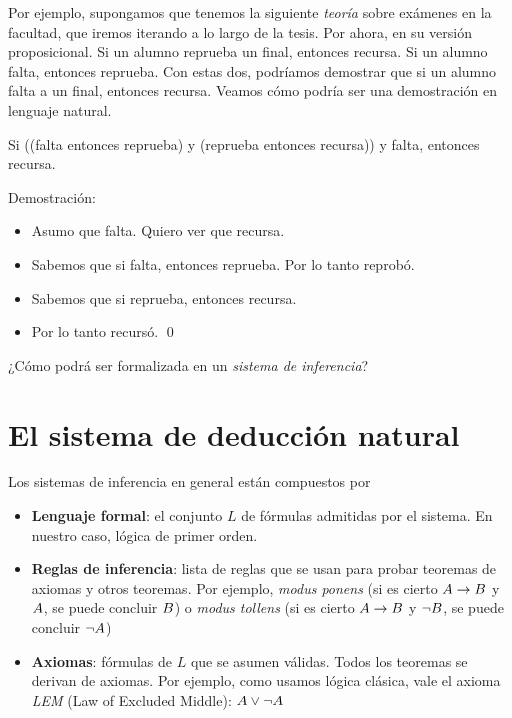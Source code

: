 Por ejemplo, supongamos que tenemos la siguiente \textit{teoría} sobre exámenes
en la facultad, que iremos iterando a lo largo de la tesis. Por ahora, en su
versión proposicional. Si un alumno reprueba un final, entonces recursa. Si un
alumno falta, entonces reprueba. Con estas dos, podríamos demostrar que si un
alumno falta a un final, entonces recursa. Veamos cómo podría ser una
demostración en lenguaje natural.

\begin{ejemplo}\label{nd:ex:exam}
    Si ((falta entonces reprueba) y (reprueba entonces recursa)) y falta, entonces recursa.

    Demostración:
\begin{itemize}
    \item Asumo que falta. Quiero ver que recursa.
    \item Sabemos que si falta, entonces reprueba. Por lo tanto reprobó.
    \item Sabemos que si reprueba, entonces recursa.
    \item Por lo tanto recursó. \qed
\end{itemize}
\end{ejemplo}

¿Cómo podrá ser formalizada en un \textit{sistema de inferencia}?

\section{El sistema de deducción natural}

Los sistemas de inferencia en general están compuestos por

\begin{itemize}
    \item \textbf{Lenguaje formal}: el conjunto $L$ de fórmulas admitidas por
    el sistema. En nuestro caso, lógica de primer orden.
    \item \textbf{Reglas de inferencia}: lista de reglas que se usan para probar
    teoremas de axiomas y otros teoremas. Por ejemplo, \textit{modus ponens} (si
    es cierto $A \to B$ y $A$, se puede concluir $B$) o
    \textit{modus tollens} (si es cierto $A \to B$ y $\neg
    B$, se puede concluir $\neg A$)
    \item \textbf{Axiomas}: fórmulas de $L$ que se asumen válidas. Todos los
    teoremas se derivan de axiomas. Por ejemplo, como usamos lógica clásica,
    vale el axioma \textit{LEM} (Law of Excluded Middle): $A \vee \neg A$
\end{itemize}

